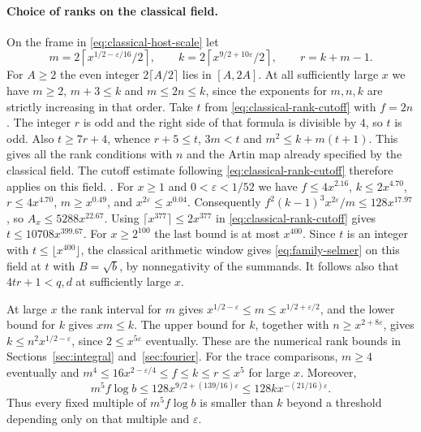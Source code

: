 \paragraph{Choice of ranks on the classical field.}
%
On the frame in \eqref{eq:classical-host-scale} let
\[
 m=2\left\lceil x^{1/2-\varepsilon/16}/2\right\rceil,\qquad
 k=2\left\lceil x^{9/2+10\varepsilon}/2\right\rceil,\qquad r=k+m-1 .
\]
For \(A\ge2\) the even integer \(2\lceil A/2\rceil\) lies in
\([A,2A]\). At all sufficiently large \(x\) we have \(m\ge2\),
\(m+3\le k\) and \(m\le 2n\le k\), since the exponents for
\(m,n,k\) are strictly increasing in that order. Take \(t\) from
\eqref{eq:classical-rank-cutoff} with \(f=2n\). The integer \(r\)
is odd and the right side of that formula is divisible by \(4\),
so \(t\) is odd. Also \(t\ge7r+4\), whence \(r+5\le t\),
\(3m<t\) and \(m^2\le k+m(t+1)\). This gives all the rank
conditions with \(n\) and the Artin map already specified by the
classical field. The cutoff estimate following
\eqref{eq:classical-rank-cutoff} therefore applies on this field.
.
For \(x\ge1\) and \(0<\varepsilon<1/52\) we have
\(f\le4x^{2.16}\), \(k\le2x^{4.70}\), \(r\le4x^{4.70}\),
\(m\ge x^{0.49}\), and \(x^{2\varepsilon}\le x^{0.04}\).
Consequently \(f^2(k-1)^3x^{2\varepsilon}/m\le128x^{17.97}\),
so \(A_x\le5288x^{22.67}\). Using
\(\lceil x^{377}\rceil\le2x^{377}\) in
\eqref{eq:classical-rank-cutoff} gives \(t\le10708x^{399.67}\).
For \(x\ge2^{100}\) the last bound is at most \(x^{400}\).
Since \(t\) is an integer with \(t\le\lfloor x^{400}\rfloor\),
the classical arithmetic window gives \eqref{eq:family-selmer}
on this field at \(t\) with \(B=\sqrt b\), by nonnegativity of
the summands. It follows
also that \(4tr+1<q,d\) at sufficiently large \(x\).

At large \(x\) the rank interval for \(m\) gives
\(x^{1/2-\varepsilon}\le m\le x^{1/2+\varepsilon/2}\),
and the lower bound for \(k\) gives \(xm\le k\).
The upper bound for \(k\), together with \(n\ge x^{2+8\varepsilon}\),
gives \(k\le n^2x^{1/2-\varepsilon}\), since \(2\le x^{5\varepsilon}\)
eventually. These are the numerical rank bounds in
Sections~\ref{sec:integral} and~\ref{sec:fourier}.
For the trace comparisons, \(m\ge4\) eventually and
\(m^4\le16x^{2-\varepsilon/4}\le f\le k\le r\le x^5\)
for large \(x\). Moreover,
\[
 m^5 f\log b\le128 x^{9/2+(139/16)\varepsilon}
              \le128 kx^{-(21/16)\varepsilon}.
\]
Thus every fixed multiple of \(m^5 f\log b\) is smaller than \(k\)
beyond a threshold depending only on that multiple and \(\varepsilon\).

